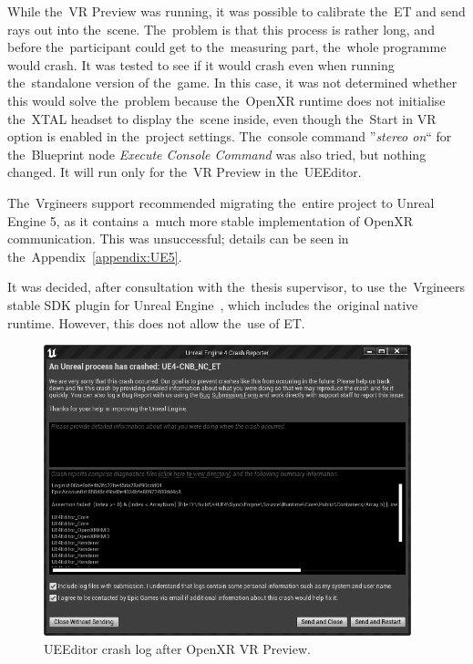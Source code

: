 While the~VR Preview was running, it was possible to calibrate the~ET and send rays out into the~scene. The~problem is that this process is rather long, and before the~participant could get to the~measuring part, the~whole programme would crash. It was tested to see if it would crash even when running the~standalone version of the~game. In this case, it was not determined whether this would solve the~problem because the~OpenXR runtime does not initialise the~XTAL headset to display the~scene inside, even though the~Start in VR option is enabled in the~project settings. The~console command ''\emph{stereo on}`` for the~Blueprint node \emph{Execute Console Command} was also tried, but nothing changed. It will run only for the~VR Preview in the~UEEditor.

The~Vrgineers support recommended migrating the~entire project to Unreal Engine 5, as it contains a~much more stable implementation of OpenXR communication. This was unsuccessful; details can be seen in the~Appendix~\ref{appendix:UE5}.

It was decided, after consultation with the~thesis supervisor, to use the~Vrgineers stable SDK plugin for Unreal Engine~\cite{vrgineers-unreal-sdk}, which includes the~original native runtime. However, this does not allow the~use of ET.

\begin{figure}[!t]\centering
    \includegraphics[width=0.95\textwidth]{img/unreal-error-msg.png}
    \caption{UEEditor crash log after OpenXR VR Preview.}
    \label{fig:unreal-error-msg}
\end{figure}

